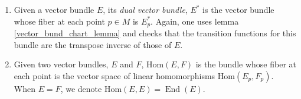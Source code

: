 \begin{example}
\begin{enumerate}
    \[
    \Gamma_{\Phi_1 \Psi_1} \circ \Gamma_{\Phi_2 \Psi_2}^{-1}(p,u) = (p, \left[\tau(p) \otimes \hat{\tau}(p)\right](u)),
    \]
    where \(\tau(p) \otimes \hat{\tau}(p)\) is the \textit{tensor product of linear maps}, i.e. the linear extension of the map acting on decomposable elements as \(\left[\tau(p) \otimes \hat{\tau}(p)\right] (v \otimes w)= \left[\tau(p)v \right] \otimes \left[\hat{\tau}(p) w\right]\) (this map is well-defined by the universal property of tensor products). Indeed,
    \begin{align*}
        \Gamma_{\Phi_1 \Psi_1} \circ \Gamma_{\Phi_2 \Psi_2}^{-1}(p, v \otimes w) & = \Gamma_{\Phi_1 \Psi_2}(p, \Phi_2^{-1}(p,v)\otimes \Psi_2^{-1}(p,v)) \\
        & = \Gamma_{\Phi_1 \Psi_1}(p, \pi_r(\Phi_1\circ \Phi_2^{-1}(p,v)) \otimes \pi_2(\Psi_1 \circ \Psi_2(p,w))) \\
        & = (p, \left[\tau(p)v \right] \otimes \left[\hat{\tau}(p) w\right])
    \end{align*}
    and by linear extension, we see that this works for every vector in \(\K^s \otimes \K^r\). Finally, \(\tau \otimes \hat{\tau}\colon U \cap V \to \mathrm{GL}(r, \K) \otimes \mathrm{GL}(s, \K) \cong \mathrm{GL}(r\cdot s, \K)\), and it is an \(\mathcal{S}\)-morphism (this is essentially due to the way the tensor product of matrices is defined see \parencite[Section 11.2]{dummit2003abstract}).
    \item Given a vector bundle \(E\), its \textit{dual vector bundle}, \(E^*\) is the vector bundle whose fiber at each point \(p \in M\) is \(E_p^*\). Again, one uses lemma \ref{vector_bund_chart_lemma} and checks that the transition functions for this bundle are the transpose inverse of those of \(E\).
    \item Given two vector bundles, \(E\) and \(F\), \(\mathrm{Hom}(E,F)\) is the bundle whose fiber at each point is the vector space of linear homomorphisms \(\mathrm{Hom}(E_p, F_p)\). When \(E=F\), we denote \(\mathrm{Hom}(E,E)=\operatorname{End}(E)\).


\end{enumerate}
\end{example}
